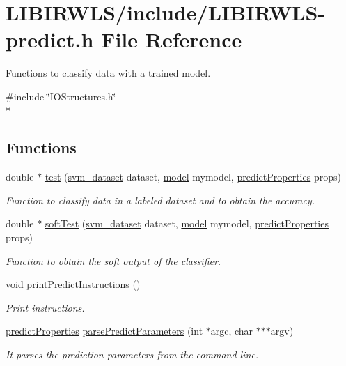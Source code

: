 \hypertarget{LIBIRWLS-predict_8h}{}\section{L\+I\+B\+I\+R\+W\+L\+S/include/\+L\+I\+B\+I\+R\+W\+L\+S-\/predict.h File Reference}
\label{LIBIRWLS-predict_8h}


Functions to classify data with a trained model.  


{\ttfamily \#include \char`\"{}I\+O\+Structures.\+h\char`\"{}}\\*
\subsection*{Functions}
\begin{DoxyCompactItemize}
\item 
double $\ast$ \hyperlink{LIBIRWLS-predict_8h_ae3fc6988def0487bb4bb47b759ba3d0b}{test} (\hyperlink{structsvm__dataset}{svm\+\_\+dataset} dataset, \hyperlink{structmodel}{model} mymodel, \hyperlink{structpredictProperties}{predict\+Properties} props)
\begin{DoxyCompactList}\small\item\em Function to classify data in a labeled dataset and to obtain the accuracy. \end{DoxyCompactList}\item 
double $\ast$ \hyperlink{LIBIRWLS-predict_8h_a47a2cacfccb7e9f9ef8b273b5d5a7498}{soft\+Test} (\hyperlink{structsvm__dataset}{svm\+\_\+dataset} dataset, \hyperlink{structmodel}{model} mymodel, \hyperlink{structpredictProperties}{predict\+Properties} props)
\begin{DoxyCompactList}\small\item\em Function to obtain the soft output of the classifier. \end{DoxyCompactList}\item 
void \hyperlink{LIBIRWLS-predict_8h_a53efcb64ca8e76d4a2cb65991189af91}{print\+Predict\+Instructions} ()
\begin{DoxyCompactList}\small\item\em Print instructions. \end{DoxyCompactList}\item 
\hyperlink{structpredictProperties}{predict\+Properties} \hyperlink{LIBIRWLS-predict_8h_a186e63263bf147110137e90adafcb8c7}{parse\+Predict\+Parameters} (int $\ast$argc, char $\ast$$\ast$$\ast$argv)
\begin{DoxyCompactList}\small\item\em It parses the prediction parameters from the command line. \end{DoxyCompactList}\end{DoxyCompactItemize}


